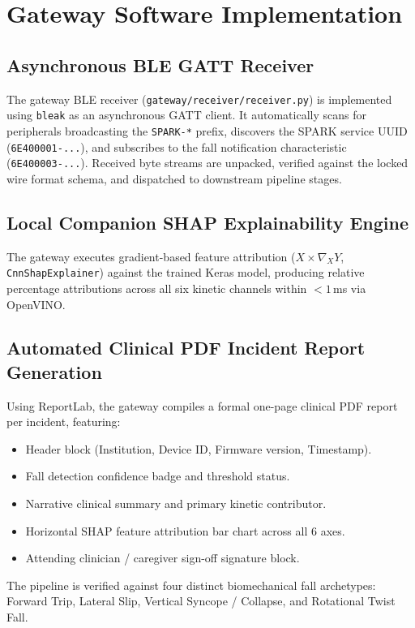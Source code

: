 \section{Gateway Software Implementation}

\subsection{Asynchronous BLE GATT Receiver}

The gateway BLE receiver (\texttt{gateway/receiver/receiver.py}) is implemented using \texttt{bleak} as an asynchronous GATT client. It automatically scans for peripherals broadcasting the \texttt{SPARK-*} prefix, discovers the SPARK service UUID (\texttt{6E400001-...}), and subscribes to the fall notification characteristic (\texttt{6E400003-...}). Received byte streams are unpacked, verified against the locked wire format schema, and dispatched to downstream pipeline stages.

\subsection{Local Companion SHAP Explainability Engine}

The gateway executes gradient-based feature attribution (\(X \times \nabla_X Y\), \texttt{CnnShapExplainer}) against the trained Keras model, producing relative percentage attributions across all six kinetic channels within \(<1\)\,ms via OpenVINO.

\subsection{Automated Clinical PDF Incident Report Generation}

Using ReportLab, the gateway compiles a formal one-page clinical PDF report per incident, featuring:
\begin{itemize}
    \item Header block (Institution, Device ID, Firmware version, Timestamp).
    \item Fall detection confidence badge and threshold status.
    \item Narrative clinical summary and primary kinetic contributor.
    \item Horizontal SHAP feature attribution bar chart across all 6 axes.
    \item Attending clinician / caregiver sign-off signature block.
\end{itemize}
The pipeline is verified against four distinct biomechanical fall archetypes: Forward Trip, Lateral Slip, Vertical Syncope / Collapse, and Rotational Twist Fall.

